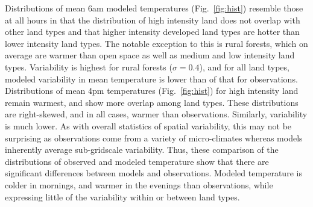 Distributions of mean 6am modeled temperatures (Fig.~\ref{fig:hist}) resemble those at all hours in that the distribution of high intensity land does not overlap with other land types and that higher intensity developed land types are hotter than lower intensity land types. The notable exception to this is rural forests, which on average are warmer than open space as well as medium and low intensity land types. Variability is highest for rural forests ($\sigma = 0.4$), and for all land types, modeled variability in mean temperature is lower than of that for observations. Distributions of mean 4pm temperatures (Fig.~\ref{fig:hist}) for high intensity land remain warmest, and show more overlap among land types. These distributions are right-skewed, and in all cases, warmer than observations. Similarly, variability is much lower. As with overall statistics of spatial variability, this may not be surprising as observations come from a variety of micro-climates whereas models inherently average sub-gridscale variability. Thus, these comparison of the distributions of observed and modeled temperature show that there are significant differences between models and observations. Modeled temperature is colder in mornings, and warmer in the evenings than observations, while expressing little of the variability within or between land types. 

